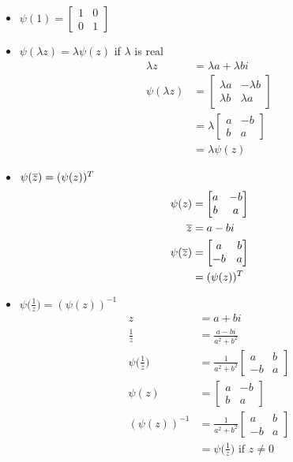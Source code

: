 \documentclass[12pt]{article}
\begin{document}
\begin{itemize}
\item $\psi(1) = \begin{bmatrix} 1 & 0 \\ 0 & 1 \end{bmatrix} $
\item $\psi(\lambda z) = \lambda \psi(z)$ if $\lambda$ is real \\ 
 $$ \begin{aligned} \lambda z &= \lambda a + \lambda bi \\ \psi(\lambda z) &= \begin{bmatrix} \lambda a & -\lambda b \\ \lambda b & \lambda a \end{bmatrix} \\ &= \lambda \begin{bmatrix} a & -b \\ b & a \end{bmatrix} \\ &= \lambda \psi(z) \end{aligned} $$ 
 \item $\psi(\overline{z}) = (\psi(z))^T$ $$ \begin{aligned} \psi(z) &= \begin{bmatrix} a & -b \\ b & a \end{bmatrix} \\ \overline{z} &= a - bi \\ \psi(\overline{z}) &= \begin{bmatrix} a & b \\ -b & a \end{bmatrix} \\ &= (\psi(z))^T \end{aligned} $$ 
 \item $\psi\Big( \frac{1}{z} \Big) = (\psi(z))^{-1}$ $$ \begin{aligned} z &= a + bi \\ \frac{1}{z} &= \frac{a-bi}{a^2 + b^2} \\ \psi\Big( \frac{1}{z} \Big) &= \frac{1}{a^2 + b^2} \begin{bmatrix} a & b \\ -b & a \end{bmatrix} \\ \psi(z) &= \begin{bmatrix} a & -b \\ b & a \end{bmatrix} \\ (\psi(z))^{-1} &= \frac{1}{a^2 + b^2} \begin{bmatrix} a & b \\ -b & a \end{bmatrix} \\ &= \psi\Big( \frac{1}{z} \Big) \text{ if } z \neq 0 \end{aligned} $$ 

\end{itemize}
\end{document}
